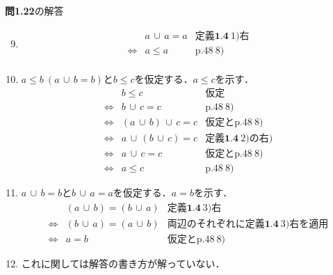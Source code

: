 \documentclass[11pt,dvipdfmx]{jreport}
\begin{document}
\vspace{5mm}
\par

\noindent \textbf{問1.22}の解答
\begin{enumerate}
  \setcounter{enumi}{8}
  \renewcommand{\labelenumi}{\arabic{enumi}) }
 \item  
   \begin{equation*}
     \begin{array}{lll}
           & a \, \cup \, a = a & \mathrm{\textbf{定義1.4} \ 1)右} \\
     \iff  & a \leq a & \mathrm{p.48 \ 8)} \\
     \end{array}
   \end{equation*}
 \item $a \leq b \ (a \, \cup \, b = b)$と$b \leq c$を仮定する．$a \leq c$を示す．
   \begin{equation*}
     \begin{array}{lll}
           & b \leq c & \mathrm{仮定} \\
     \iff  & b \, \cup \, c = c & \mathrm{p.48 \ 8)} \\
     \iff  & (a \, \cup \, b) \, \cup \, c = c & \mathrm{仮定とp.48 \ 8)} \\
     \iff  & a \, \cup \, (b \, \cup \, c) = c & \mathrm{\textbf{定義1.4} \ 2)の右)} \\
     \iff  & a \, \cup \, c = c & \mathrm{仮定とp.48 \ 8)} \\
     \iff  & a \leq c & \mathrm{p.48 \ 8)}
     \end{array}
   \end{equation*}
 \item $a \, \cup \, b = b$と$b \, \cup \, a = a$を仮定する．$a = b$を示す．
   \begin{equation*}
     \begin{array}{lll}
           & (a \, \cup \, b) = (b \, \cup \, a) & \mathrm{\textbf{定義1.4} \ 3)右} \\
     \iff  & (b \, \cup \, a) = (a \, \cup \, b) & \mathrm{両辺のそれぞれに\textbf{定義1.4} \ 3)右を適用} \\
     \iff  & a = b & \mathrm{仮定とp.48 \ 8)}
     \end{array}
   \end{equation*}
 \item これに関しては解答の書き方が解っていない．
   \begin{equation*}
     \begin{array}{lll}

\end{array}
\end{equation*}
\end{enumerate}
\end{document}
